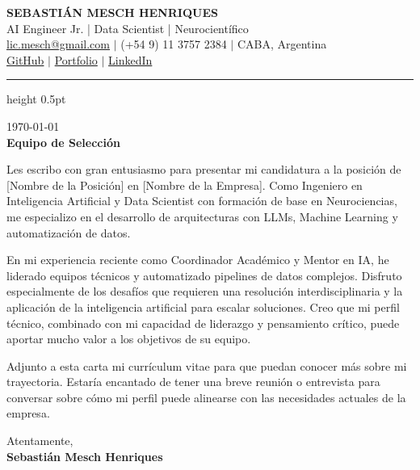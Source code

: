 \documentclass[11pt,a4paper]{article}
\begin{document}
\begin{center}
{\bfseries\LARGE \uppercase{Sebastián Mesch Henriques}}\\[3pt]
{\color{accent}\large AI Engineer Jr. | Data Scientist | Neurocientífico }\\[6pt]

{\normalsize
\href{mailto:lic.mesch@gmail.com}{lic.mesch@gmail.com} $|$
(+54 9) 11 3757 2384 $|$
CABA, Argentina\\
\href{ https://github.com/SMESCH1 }{GitHub} $|$
\href{ https://smesch1.github.io/ }{Portfolio} $|$
\href{ https://linkedin.com/in/sebastian-mesch-henriques }{LinkedIn}
}
\end{center}

{\color{accent}\hrule height 0.5pt}\vspace{24pt}

\begin{flushleft}
\today\\[1em]
\textbf{Equipo de Selección}\\
[Nombre de la Empresa]
\end{flushleft}

\vspace{1em}


Les escribo con gran entusiasmo para presentar mi candidatura a la posición de [Nombre de la Posición] en [Nombre de la Empresa]. Como Ingeniero en Inteligencia Artificial y Data Scientist con formación de base en Neurociencias, me especializo en el desarrollo de arquitecturas con LLMs, Machine Learning y automatización de datos.

En mi experiencia reciente como Coordinador Académico y Mentor en IA, he liderado equipos técnicos y automatizado pipelines de datos complejos. Disfruto especialmente de los desafíos que requieren una resolución interdisciplinaria y la aplicación de la inteligencia artificial para escalar soluciones. Creo que mi perfil técnico, combinado con mi capacidad de liderazgo y pensamiento crítico, puede aportar mucho valor a los objetivos de su equipo.

Adjunto a esta carta mi currículum vitae para que puedan conocer más sobre mi trayectoria. Estaría encantado de tener una breve reunión o entrevista para conversar sobre cómo mi perfil puede alinearse con las necesidades actuales de la empresa.


\vspace{2em}

\begin{flushleft}
Atentamente,\\[1em]
\textbf{Sebastián Mesch Henriques}
\end{flushleft}
\end{document}
